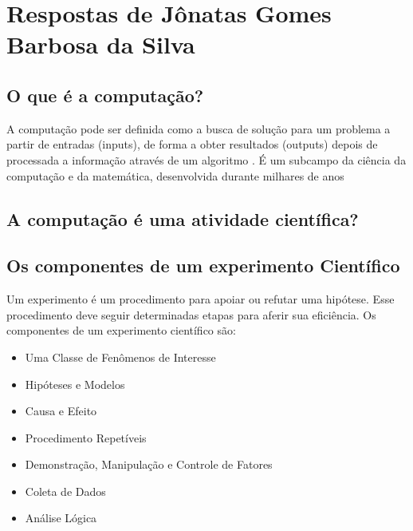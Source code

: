 \section{Respostas de Jônatas Gomes Barbosa da Silva}

\subsection{O que é a computação?}
A computação pode ser definida como a busca de solução para um problema a partir de entradas (inputs), de forma a obter resultados (outputs) depois de processada a informação através de um algoritmo \citet{wikipedia_computacao_2022}. É um subcampo da ciência da computação e da matemática, desenvolvida durante milhares de anos

\subsection{A computação é uma atividade científica?}


\subsection{Os componentes de um experimento Científico}
Um \gls{experimento} é um procedimento para apoiar ou refutar uma hipótese. Esse procedimento deve seguir determinadas etapas para aferir sua eficiência. Os componentes de um experimento científico são:
\begin{itemize}
    \item Uma Classe de Fenômenos de Interesse
    \item Hipóteses e Modelos
    \item Causa e Efeito
    \item Procedimento Repetíveis
    \item Demonstração, Manipulação e Controle de Fatores
    \item Coleta de Dados
    \item Análise Lógica
\end{itemize}
